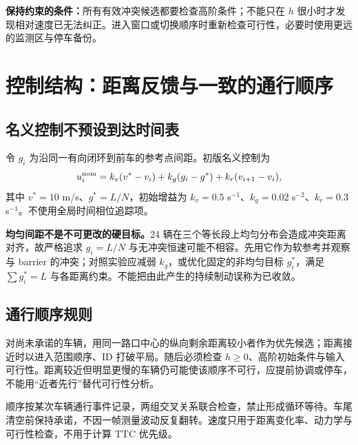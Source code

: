 \documentclass[UTF8,fontset=fandol,11pt,a4paper]{ctexart}
\newcommand{\page}[1]{\clearpage\section{#1}}
\begin{document}
\textbf{保持约束的条件：}所有有效冲突候选都要检查高阶条件；不能只在 $h$ 很小时才发现相对速度已无法纠正。进入窗口或切换顺序时重新检查可行性，必要时使用更远的监测区与停车备份。


\page{控制结构：距离反馈与一致的通行顺序}
\begin{center}
\end{center}
\subsection{名义控制不预设到达时间表}
令 $g_i$ 为沿同一有向闭环到前车的参考点间距。初版名义控制为
\[
u_i^{\mathrm{nom}}=k_v(v^*-v_i)+k_g(g_i-g^*)+k_r(v_{i+1}-v_i),
\]
其中 $v^*=10$ m/s、$g^*=L/N$，初始增益为 $k_v=0.5$ s$^{-1}$、$k_g=0.02$ s$^{-2}$、$k_r=0.3$ s$^{-1}$。不使用全局时间相位追踪项。

\textbf{均匀间距不是不可更改的硬目标。}24 辆在三个等长段上均匀分布会造成冲突距离对齐，故严格追求 $g_i=L/N$ 与无冲突恒速可能不相容。先用它作为软参考并观察与 barrier 的冲突；对照实验应减弱 $k_g$，或优化固定的非均匀目标 $g_i^*$，满足 $\sum g_i^*=L$ 与各距离约束。不能把由此产生的持续制动误称为已收敛。

\subsection{通行顺序规则}
对尚未承诺的车辆，用同一路口中心的纵向剩余距离较小者作为优先候选；距离接近时以进入范围顺序、ID 打破平局。随后必须检查 $h\geq0$、高阶初始条件与输入可行性。距离较近但明显更慢的车辆仍可能使该顺序不可行，应提前协调或停车，不能用“近者先行”替代可行性分析。

顺序按某次车辆通行事件记录，两组交叉关系联合检查，禁止形成循环等待。车尾清空前保持承诺，不因一帧测量波动反复翻转。速度只用于距离变化率、动力学与可行性检查，不用于计算 TTC 优先级。
\end{document}

